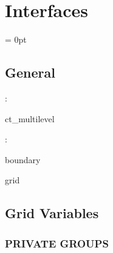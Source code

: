 
\section{Interfaces} 


\parskip = 0pt

\vspace{3mm} \subsection*{General}

: 

ct\_multilevel
\vspace{2mm}

: 

boundary

grid
\vspace{2mm}
\subsection*{Grid Variables}
\vspace{5mm}\subsubsection{PRIVATE GROUPS}

\vspace{5mm}


